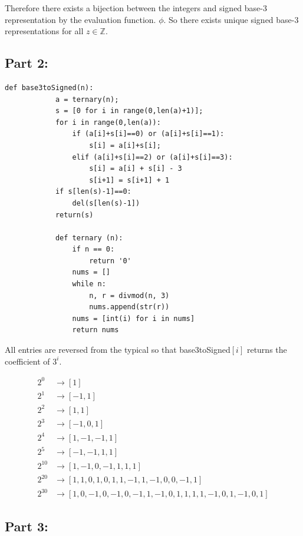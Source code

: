 \documentclass[12pt,letterpaper]{article}
\begin{document}
    Therefore there exists a bijection between the integers and signed base-3 representation by the evaluation function. $\phi$. So there exists unique signed base-3 representations for all $z\in\mathbb{Z}$.
\newpage
\subsection*{Part 2:}
            \begin{lstlisting}[style = Python]
            def base3toSigned(n):
            a = ternary(n);
            s = [0 for i in range(0,len(a)+1)];
            for i in range(0,len(a)):
                if (a[i]+s[i]==0) or (a[i]+s[i]==1):
                    s[i] = a[i]+s[i]; 
                elif (a[i]+s[i]==2) or (a[i]+s[i]==3):
                    s[i] = a[i] + s[i] - 3
                    s[i+1] = s[i+1] + 1
            if s[len(s)-1]==0:
                del(s[len(s)-1])
            return(s)
            
            def ternary (n):
                if n == 0:
                    return '0'
                nums = []
                while n:
                    n, r = divmod(n, 3)
                    nums.append(str(r))
                nums = [int(i) for i in nums]
                return nums
            \end{lstlisting}
    All entries are reversed from the typical so that base3toSigned$[i]$ returns the coefficient of $3^i$.
    
    \begin{align*}
        2^0 &\rightarrow [1]\\
        2^1 &\rightarrow [-1, 1]\\
        2^2 &\rightarrow [1, 1]\\
        2^3 &\rightarrow [-1, 0, 1]\\
        2^4 &\rightarrow [1, -1, -1, 1]\\
        2^5 &\rightarrow [-1, -1, 1, 1]\\
        2^{10} &\rightarrow [1, -1, 0, -1, 1, 1, 1]\\
        2^{20} &\rightarrow [1, 1, 0, 1, 0, 1, 1, -1, 1, -1, 0, 0, -1, 1]\\
        2^{30} &\rightarrow [1, 0, -1, 0, -1, 0, -1, 1, -1, 0, 1, 1, 1, 1, -1, 0, 1, -1, 0, 1]
    \end{align*}
    
\subsection*{Part 3:}
\end{document}
